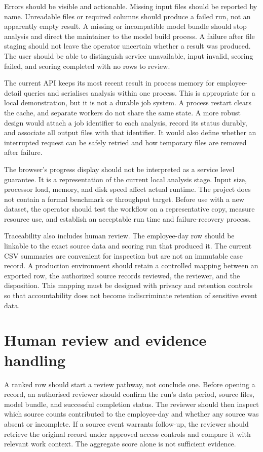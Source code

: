 Errors should be visible and actionable. Missing input files should be
reported by name. Unreadable files or required columns should produce a
failed run, not an apparently empty result. A missing or incompatible
model bundle should stop analysis and direct the maintainer to the
model build process. A failure after file staging should not leave the
operator uncertain whether a result was produced. The user should be
able to distinguish service unavailable, input invalid, scoring
failed, and scoring completed with no rows to review.

The current API keeps its most recent result in process memory for
employee-detail queries and serialises analysis within one process.
This is appropriate for a local demonstration, but it is not a durable
job system. A process restart clears the cache, and separate workers
do not share the same state. A more robust design would attach a job
identifier to each analysis, record its status durably, and associate
all output files with that identifier. It would also define whether an
interrupted request can be safely retried and how temporary files are
removed after failure.

The browser's progress display should not be interpreted as a service
level guarantee. It is a representation of the current local analysis
stage. Input size, processor load, memory, and disk speed affect actual
runtime. The project does not contain a formal benchmark or throughput
target. Before use with a new dataset, the operator should test the
workflow on a representative copy, measure resource use, and establish
an acceptable run time and failure-recovery process.

Traceability also includes human review. The employee-day row should
be linkable to the exact source data and scoring run that produced it.
The current CSV summaries are convenient for inspection but are not an
immutable case record. A production environment should retain a
controlled mapping between an exported row, the authorized source
records reviewed, the reviewer, and the disposition. This mapping must
be designed with privacy and retention controls so that accountability
does not become indiscriminate retention of sensitive event data.

\section{Human review and evidence handling}
A ranked row should start a review pathway, not conclude one. Before
opening a record, an authorised reviewer should confirm the run's data
period, source files, model bundle, and successful completion status.
The reviewer should then inspect which source counts contributed to
the employee-day and whether any source was absent or incomplete. If a
source event warrants follow-up, the reviewer should retrieve the
original record under approved access controls and compare it with
relevant work context. The aggregate score alone is not sufficient
evidence.

